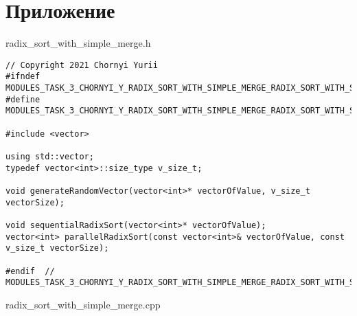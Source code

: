 \documentclass{report}
\begin{document}
\section*{Приложение}

\begin{center}
    radix\_sort\_with\_simple\_merge.h
\end{center}
\begin{lstlisting}
// Copyright 2021 Chornyi Yurii
#ifndef MODULES_TASK_3_CHORNYI_Y_RADIX_SORT_WITH_SIMPLE_MERGE_RADIX_SORT_WITH_SIMPLE_MERGE_H_
#define MODULES_TASK_3_CHORNYI_Y_RADIX_SORT_WITH_SIMPLE_MERGE_RADIX_SORT_WITH_SIMPLE_MERGE_H_

#include <vector>

using std::vector;
typedef vector<int>::size_type v_size_t;

void generateRandomVector(vector<int>* vectorOfValue, v_size_t vectorSize);

void sequentialRadixSort(vector<int>* vectorOfValue);
vector<int> parallelRadixSort(const vector<int>& vectorOfValue, const v_size_t vectorSize);

#endif  // MODULES_TASK_3_CHORNYI_Y_RADIX_SORT_WITH_SIMPLE_MERGE_RADIX_SORT_WITH_SIMPLE_MERGE_H_

\end{lstlisting}
\begin{center}
    radix\_sort\_with\_simple\_merge.cpp
\end{center}
\end{document}
